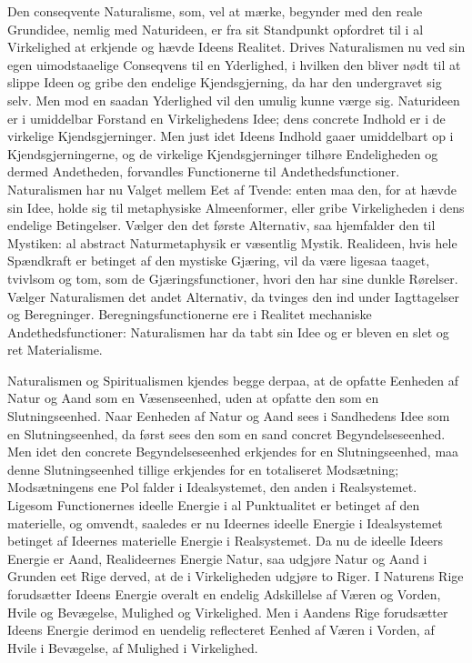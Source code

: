 \documentclass[12pt]{book}
\newcommand{\opage}[1]{\marginnote{\footnotesize\textit{[#1]}}}
\begin{document}
Den conseqvente Naturalisme, som, vel at mærke, begynder med den reale Grundidee, nemlig med
Naturideen, er fra sit Standpunkt opfordret til i al Virkelighed at erkjende og hævde Ideens Realitet.
Drives Naturalismen nu ved sin egen uimodstaaelige Conseqvens til en Yderlighed, i hvilken den bliver
nødt til at slippe Ideen og gribe den endelige Kjendsgjerning, da har den undergravet sig selv. Men
mod en saadan Yderlighed vil den umulig kunne værge sig. Naturideen er i umiddelbar Forstand en
Virkelighedens Idee; dens concrete Indhold er i de virkelige Kjendsgjerninger. Men just idet Ideens
Indhold gaaer umiddelbart op i Kjendsgjerningerne, og de virkelige Kjendsgjerninger tilhøre
Endeligheden og dermed Andetheden, forvandles Functionerne til Andethedsfunctioner. Naturalismen har
nu Valget mellem Eet af Tvende: enten maa den, for at hævde sin Idee, holde sig til metaphysiske
Almeenformer, eller gribe Virkeligheden i dens endelige Betingelser. Vælger den det første Alternativ,
saa hjemfalder den til Mystiken: al abstract Naturmetaphysik er væsentlig Mystik. Realideen, hvis hele
Spændkraft er betinget af den mystiske Gjæring, vil da være ligesaa
\opage{455} taaget, tvivlsom og tom, som de Gjæringsfunctioner, hvori den har sine dunkle Rørelser. Vælger
Naturalismen det andet Alternativ, da tvinges den ind under Iagttagelser og Beregninger.
Beregningsfunctionerne ere i Realitet mechaniske Andethedsfunctioner: Naturalismen har da tabt sin
Idee og er bleven en slet og ret Materialisme.

Naturalismen og Spiritualismen kjendes begge derpaa, at de opfatte Eenheden af Natur og Aand som en
Væsenseenhed, uden at opfatte den som en Slutningseenhed. Naar Eenheden af Natur og Aand sees i
Sandhedens Idee som en Slutningseenhed, da først sees den som en sand concret Begyndelseseenhed. Men
idet den concrete Begyndelseseenhed erkjendes for en Slutningseenhed, maa denne Slutningseenhed
tillige erkjendes for en totaliseret Modsætning; Modsætningens ene Pol falder i Idealsystemet, den
anden i Realsystemet. Ligesom Functionernes ideelle Energie i al Punktualitet er betinget af den
materielle, og omvendt, saaledes er nu Ideernes ideelle Energie i Idealsystemet betinget af Ideernes
materielle Energie i Realsystemet. Da nu de ideelle Ideers Energie er Aand, Realideernes Energie
Natur, saa udgjøre Natur og Aand i Grunden eet Rige derved, at de i Virkeligheden udgjøre to Riger. I
Naturens Rige forudsætter Ideens Energie overalt en endelig Adskillelse af Væren og Vorden, Hvile og
Bevægelse, Mulighed og Virkelighed. Men i Aandens Rige forudsætter Ideens Energie derimod en uendelig
reflecteret Eenhed af Væren i Vorden, af Hvile i Bevægelse, af Mulighed i Virkelighed.
\end{document}
